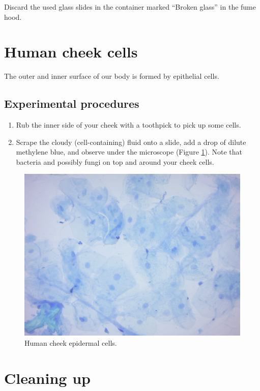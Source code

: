 Discard the used glass slides in the container marked ``Broken glass''
in the fume hood.

\section{Human cheek cells}\label{human-cheek-cells}

The outer and inner surface of our body is formed by epithelial cells.

\subsection{Experimental procedures}\label{experimental-procedures-11}

\begin{enumerate}
\def\labelenumi{\arabic{enumi}.}
\tightlist
\item
  Rub the inner side of your cheek with a toothpick to pick up some
  cells.
\item
  Scrape the cloudy (cell-containing) fluid onto a slide, add a drop of
  dilute methylene blue, and observe under the microscope (Figure \ref{fig:cheek}). Note that
  bacteria and possibly fungi on top and around your cheek cells.
\end{enumerate}

\begin{figure}

{\centering \includegraphics[width=0.7\linewidth]{./figures/cell_struc/cheek} 

}

\caption{Human cheek epidermal cells.}\label{fig:cheek}
\end{figure}

\section{Cleaning up}\label{cleaning-up-4}

